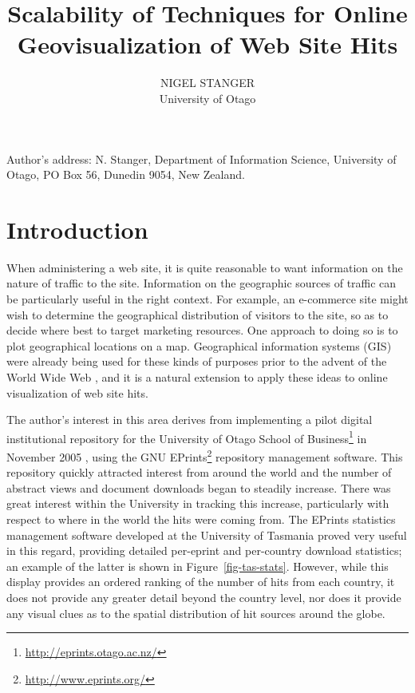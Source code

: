 \documentclass[acmnow]{acmtrans2m}
\title{Scalability of Techniques for Online Geovisualization of Web Site Hits}
\author{NIGEL STANGER \\ University of Otago}
\begin{document}


            
\begin{bottomstuff} 
Author's address: N. Stanger, Department of Information Science,
University of Otago, PO Box 56, Dunedin 9054, New Zealand.
\end{bottomstuff}
            
\maketitle


\section{Introduction}
\label{sec-introduction}

When administering a web site, it is quite reasonable to want
information on the nature of traffic to the site. Information on the
geographic sources of traffic can be particularly useful in the right
context. For example, an e-commerce site might wish to determine the
geographical distribution of visitors to the site, so as to decide where
best to target marketing resources. One approach to doing so is to plot
geographical locations on a map. Geographical information systems (GIS)
were already being used for these kinds of purposes prior to the advent
of the World Wide Web \cite{Beau-JR-1991-GIS}, and it is a natural
extension to apply these ideas to online visualization of web site hits.

The author's interest in this area derives from implementing a pilot
digital institutional repository for the University of Otago School of
Business\footnote{\url{http://eprints.otago.ac.nz/}} in November 2005
\cite{Stan-N-2006-running}, using the GNU
EPrints\footnote{\url{http://www.eprints.org/}} repository management
software. This repository quickly attracted interest from around the
world and the number of abstract views and document downloads began to
steadily increase. There was great interest within the University in
tracking this increase, particularly with respect to where in the world
the hits were coming from. The EPrints statistics management software
developed at the University of Tasmania \cite{Sale-A-2006-stats} proved
very useful in this regard, providing detailed per-eprint and
per-country download statistics; an example of the latter is shown in
Figure~\ref{fig-tas-stats}. However, while this display provides an
ordered ranking of the number of hits from each country, it does not
provide any greater detail beyond the country level, nor does it provide
any visual clues as to the spatial distribution of hit sources around
the globe.
\end{document}
